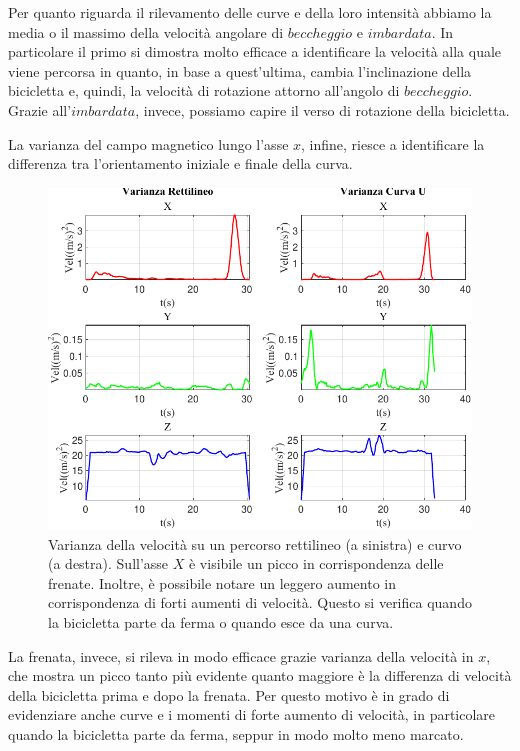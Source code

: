 \documentclass[class=article]{standalone}
\begin{document}
	Per quanto riguarda il rilevamento delle curve e della loro intensità abbiamo la media o il massimo della velocità angolare di \(beccheggio\) e \(imbardata\). In particolare il primo si dimostra molto efficace a identificare la velocità alla quale viene percorsa in quanto, in base a quest'ultima, cambia l'inclinazione della bicicletta e, quindi, la velocità di rotazione attorno all'angolo di \(beccheggio\). Grazie all'\(imbardata\), invece, possiamo capire il verso di rotazione della bicicletta.
	
	La varianza del campo magnetico lungo l'asse \(x\), infine, riesce a identificare la differenza tra l'orientamento iniziale e finale della curva.\hfill\break
	
	\begin{center}
		\begin{figure}[h!]
			\centering\includegraphics[width=.7\textwidth]{img/LungaCurvaU/Vel/Varianza}
			\caption[]{Varianza della velocità su un percorso rettilineo (a sinistra) e curvo (a destra). Sull'asse \(X\) è visibile un picco in corrispondenza delle frenate. Inoltre, è possibile notare un leggero aumento in corrispondenza di forti aumenti di velocità. Questo si verifica quando la bicicletta parte da ferma o quando esce da una curva.}
			\label{fig:VelVar_LungaCurvaU}
		\end{figure}
	\end{center}
	
	La frenata, invece, si rileva in modo efficace grazie varianza della velocità in \(x\), che mostra un picco tanto più evidente quanto maggiore è la differenza di velocità della bicicletta prima e dopo la frenata. Per questo motivo è in grado di evidenziare anche curve e i momenti di forte aumento di velocità, in particolare quando la bicicletta parte da ferma, seppur in modo molto meno marcato.
	
\end{document}
